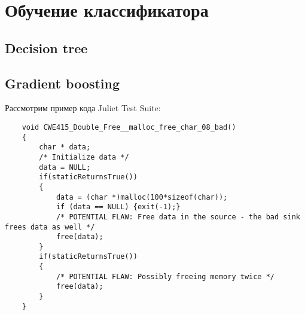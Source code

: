 \section{Обучение классификатора}

\subsection{Decision tree}
\subsection{Gradient boosting}

Рассмотрим пример кода Juliet Test Suite:

\begin{verbatim}
    void CWE415_Double_Free__malloc_free_char_08_bad()
    {
        char * data;
        /* Initialize data */
        data = NULL;
        if(staticReturnsTrue())
        {
            data = (char *)malloc(100*sizeof(char));
            if (data == NULL) {exit(-1);}
            /* POTENTIAL FLAW: Free data in the source - the bad sink frees data as well */
            free(data);
        }
        if(staticReturnsTrue())
        {
            /* POTENTIAL FLAW: Possibly freeing memory twice */
            free(data);
        }
    }
\end{verbatim}

